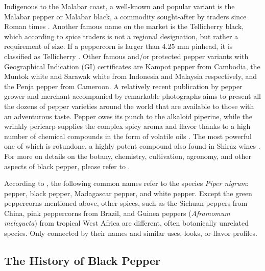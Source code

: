 Indigenous to the Malabar coast, a well-known and popular variant is the Malabar pepper or Malabar black, a commodity sought-after by traders since Roman times \autocite{de_romanis_indo-roman_2020}. Another famous name on the market is the Tellicherry black, which according to spice traders is not a regional designation, but rather a requirement of size. If a peppercorn is larger than 4.25 mm pinhead, it is classified as Tellicherry \autocite{eirinberg_tellicherry_2021}. Other famous and/or protected pepper variants with Geographical Indication (GI) certificates are Kampot pepper from Cambodia, the Muntok white and Sarawak white from Indonesia and Malaysia respectively, and the Penja pepper from Cameroon. A relatively recent publication by pepper grower and merchant \textcite{de_kerros_pepper_2016} accompanied by remarkable photographs aims to present all the dozens of pepper varieties around the world that are available to those with an adventurous taste.
Pepper owes its punch to the alkaloid piperine, while the wrinkly pericarp supplies the complex spicy aroma and flavor thanks to a high number of chemical compounds in the form of volatile oils \autocite[467]{ravindran_black_2000}. The most powerful one of which is rotundone, a highly potent compound also found in Shiraz wines \autocite{wood_wine_2008}. For more on details on the botany, chemistry, cultivation, agronomy, and other aspects of black pepper, please refer to \textcite{ravindran_black_2000, nair_agronomy_2011, parthasarathy_chemistry_2008}.

According to \textcite[695]{mabberley_mabberleys_2017}, the following common names refer to the species \textit{Piper nigrum}: pepper, black pepper, Madagascar pepper, and white pepper. Except the green peppercorns mentioned above, other spices, such as the Sichuan peppers from China, pink peppercorns from Brazil, and Guinea peppers (\textit{Aframomum melegueta}) from tropical West Africa are different, often botanically unrelated species. Only connected by their names and similar uses, looks, or flavor profiles.

\subsection{The History of Black Pepper}

